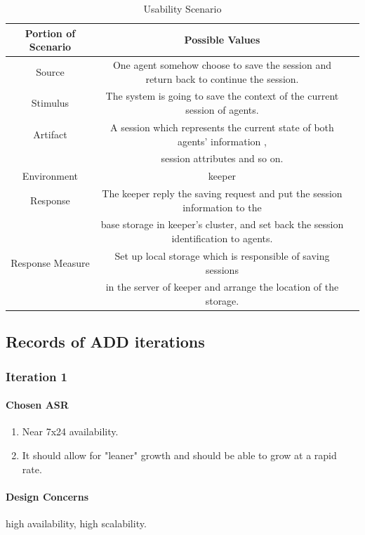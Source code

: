 \documentclass{article}
\begin{document}
	\begin{center}
		\begin{table}[!htb]
		\begin{tabular}{ccc}
		\toprule  
		Portion of Scenario & Possible Values\\
		\midrule 
		Source 	& One agent somehow choose to save the session and return back to continue the session.\\
		Stimulus & The system is going to save the context of the current session of agents.\\
		Artifact & A session which represents the current state of both agents' information , \\
		& session attributes and so on.\\
		Environment & keeper \\
		Response & The keeper reply the saving request and put the session information to the \\
		& base storage in keeper's cluster, and set back the session identification to agents.\\
		Response Measure & Set up local storage which is responsible of saving sessions\\
		& in the server of keeper and arrange the location of the storage.\\
		\bottomrule
		\end{tabular}
		\caption{Usability Scenario}
		\end{table}
	\end{center}
	
\newpage

	\subsection{Records of ADD iterations}
		\subsubsection{Iteration 1}
			\paragraph{Chosen ASR}
			\begin{enumerate}
			\item Near 7x24 availability.
			\item It should allow for "leaner" growth and should be able to grow at a rapid rate.
			\end{enumerate}
			\paragraph{Design Concerns} high availability, high scalability.
\end{document}
